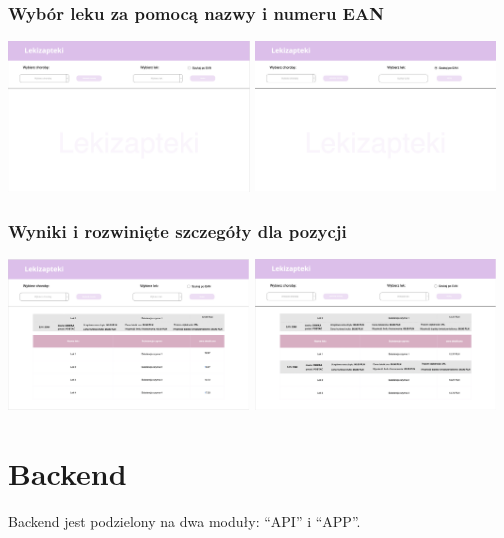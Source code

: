 \documentclass{article}
\begin{document}
      \subsubsection{Wybór leku za pomocą nazwy i numeru EAN}
      \includegraphics[width=6.4cm, height=4cm]{lekizapteki-wybor-leku-nazwa}
      \includegraphics[width=6.4cm, height=4cm]{lekizapteki-wybor-leku-ean}

      \subsubsection{Wyniki i rozwinięte szczegóły dla pozycji}
      \includegraphics[width=6.4cm, height=4cm]{lekizapteki-leki-identyczne}
      \includegraphics[width=6.4cm, height=4cm]{lekizapteki-leki-identyczne-rozwiniete}

  \section{Backend}
  Backend jest podzielony na dwa moduły: ``API'' i ``APP''.
\end{document}
